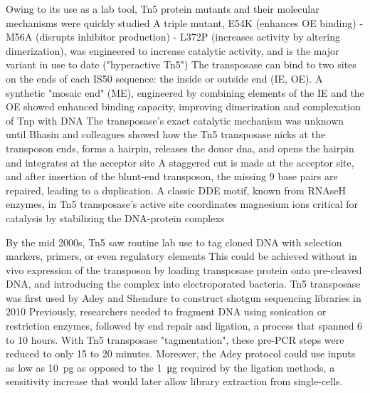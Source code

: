 Owing to its use as a lab tool, Tn5 protein mutants and their molecular mechanisms were quickly studied A triple mutant, E54K (enhances OE binding) - M56A (disrupts inhibitor production) - L372P (increases activity by altering dimerization), was engineered to increase catalytic activity, and is the major variant in use to date ("hyperactive Tn5") The transposase can bind to two sites on the ends of each IS50 sequence: the inside or outside end (IE, OE). A synthetic "mosaic end" (ME), engineered by combining elements of the IE and the OE showed enhanced binding capacity, improving dimerization and complexation of Tnp with DNA The transposase's exact catalytic mechanism was unknown until Bhasin and colleagues showed how the Tn5 transposase nicks at the transposon ends, forms a hairpin, releases the donor dna, and opens the hairpin and integrates at the acceptor site A staggered cut is made at the acceptor site, and after insertion of the blunt-end transposon, the missing 9 base pairs are repaired, leading to a duplication. A classic DDE motif, known from RNAseH enzymes, in Tn5 transposase's active site coordinates magnesium ions critical for catalysis by stabilizing the DNA-protein complexs

By the mid 2000s, Tn5 saw routine lab use to tag cloned DNA with selection markers, primers, or even regulatory elements This could be achieved without in vivo expression of the transposon by loading transposase protein onto pre-cleaved DNA, and introducing the complex into electroporated bacteria. Tn5 transposase was first used by Adey and Shendure to construct shotgun sequencing libraries in 2010 Previously, researchers needed to fragment DNA using sonication or restriction enzymes, followed by end repair and ligation, a process that spanned 6 to 10 hours. With Tn5 transposase "tagmentation", these pre-PCR steps were reduced to only 15 to 20 minutes. Moreover, the Adey protocol could use inputs as low as \SI{10}{\pico\gram} as opposed to the \SI{1}{\micro\gram} required by the ligation methods, a sensitivity increase that would later allow library extraction from single-cells.

